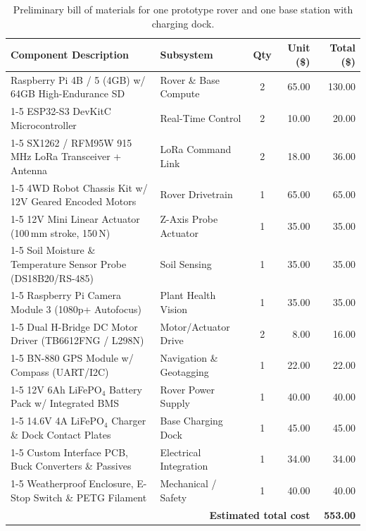 \documentclass[12pt, letterpaper]{article}
\begin{document}
\begin{table}[htbp]
    \centering
    \footnotesize
    \setlength{\extrarowheight}{2pt}
    \begin{tabularx}{\textwidth}{@{}X l c r r@{}}
        \toprule
        \textbf{Component Description} & \textbf{Subsystem} & \textbf{Qty} & \textbf{Unit (\$)} & \textbf{Total (\$)} \\
        \midrule[0.8pt]
        Raspberry Pi 4B / 5 (4GB) w/ 64GB High-Endurance SD & Rover \& Base Compute & 2 & 65.00 & 130.00 \\
        \cmidrule[0.2pt]{1-5}
        ESP32-S3 DevKitC Microcontroller & Real-Time Control & 2 & 10.00 & 20.00 \\
        \cmidrule[0.2pt]{1-5}
        SX1262 / RFM95W 915\,MHz LoRa Transceiver + Antenna & LoRa Command Link & 2 & 18.00 & 36.00 \\
        \cmidrule[0.2pt]{1-5}
        4WD Robot Chassis Kit w/ 12V Geared Encoded Motors & Rover Drivetrain & 1 & 65.00 & 65.00 \\
        \cmidrule[0.2pt]{1-5}
        12V Mini Linear Actuator (100\,mm stroke, 150\,N) & Z-Axis Probe Actuator & 1 & 35.00 & 35.00 \\
        \cmidrule[0.2pt]{1-5}
        Soil Moisture \& Temperature Sensor Probe (DS18B20/RS-485) & Soil Sensing & 1 & 35.00 & 35.00 \\
        \cmidrule[0.2pt]{1-5}
        Raspberry Pi Camera Module 3 (1080p+ Autofocus) & Plant Health Vision & 1 & 35.00 & 35.00 \\
        \cmidrule[0.2pt]{1-5}
        Dual H-Bridge DC Motor Driver (TB6612FNG / L298N) & Motor/Actuator Drive & 2 & 8.00 & 16.00 \\
        \cmidrule[0.2pt]{1-5}
        BN-880 GPS Module w/ Compass (UART/I2C) & Navigation \& Geotagging & 1 & 22.00 & 22.00 \\
        \cmidrule[0.2pt]{1-5}
        12V 6Ah LiFePO$_4$ Battery Pack w/ Integrated BMS & Rover Power Supply & 1 & 40.00 & 40.00 \\
        \cmidrule[0.2pt]{1-5}
        14.6V 4A LiFePO$_4$ Charger \& Dock Contact Plates & Base Charging Dock & 1 & 45.00 & 45.00 \\
        \cmidrule[0.2pt]{1-5}
        Custom Interface PCB, Buck Converters \& Passives & Electrical Integration & 1 & 34.00 & 34.00 \\
        \cmidrule[0.2pt]{1-5}
        Weatherproof Enclosure, E-Stop Switch \& PETG Filament & Mechanical / Safety & 1 & 40.00 & 40.00 \\
        \midrule
        \multicolumn{4}{r}{\textbf{Estimated total cost}} & \textbf{553.00} \\
        \bottomrule
    \end{tabularx}
    \caption{Preliminary bill of materials for one prototype rover and one base station with charging dock.}
    \label{tab:bom}
\end{table}
\end{document}
